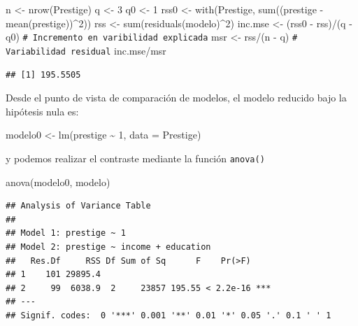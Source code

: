 \documentclass[
]{book}
\newenvironment{Shaded}{\begin{snugshade}}{\end{snugshade}}
\newcommand{\AttributeTok}[1]{\textcolor[rgb]{0.77,0.63,0.00}{#1}}
\newcommand{\CommentTok}[1]{\textcolor[rgb]{0.56,0.35,0.01}{\textit{#1}}}
\newcommand{\DecValTok}[1]{\textcolor[rgb]{0.00,0.00,0.81}{#1}}
\newcommand{\FunctionTok}[1]{\textcolor[rgb]{0.00,0.00,0.00}{#1}}
\newcommand{\NormalTok}[1]{#1}
\newcommand{\OtherTok}[1]{\textcolor[rgb]{0.56,0.35,0.01}{#1}}
\newcommand{\SpecialCharTok}[1]{\textcolor[rgb]{0.00,0.00,0.00}{#1}}
\theoremstyle{break}
\theoremstyle{nonumberplain}
\renewcommand{\CommentTok}[1]{\textcolor[rgb]{0.41,0.41,0.41}{\texttt{#1}}}
\begin{document}
\begin{Shaded}
\begin{Highlighting}[]
\NormalTok{n }\OtherTok{\textless{}{-}} \FunctionTok{nrow}\NormalTok{(Prestige)}
\NormalTok{q }\OtherTok{\textless{}{-}} \DecValTok{3}
\NormalTok{q0 }\OtherTok{\textless{}{-}} \DecValTok{1}
\NormalTok{rss0 }\OtherTok{\textless{}{-}} \FunctionTok{with}\NormalTok{(Prestige, }\FunctionTok{sum}\NormalTok{((prestige }\SpecialCharTok{{-}} \FunctionTok{mean}\NormalTok{(prestige))}\SpecialCharTok{\^{}}\DecValTok{2}\NormalTok{))}
\NormalTok{rss }\OtherTok{\textless{}{-}} \FunctionTok{sum}\NormalTok{(}\FunctionTok{residuals}\NormalTok{(modelo)}\SpecialCharTok{\^{}}\DecValTok{2}\NormalTok{)}
\NormalTok{inc.mse }\OtherTok{\textless{}{-}}\NormalTok{ (rss0 }\SpecialCharTok{{-}}\NormalTok{ rss)}\SpecialCharTok{/}\NormalTok{(q }\SpecialCharTok{{-}}\NormalTok{ q0)  }\CommentTok{\# Incremento en varibilidad explicada}
\NormalTok{msr }\OtherTok{\textless{}{-}}\NormalTok{  rss}\SpecialCharTok{/}\NormalTok{(n }\SpecialCharTok{{-}}\NormalTok{ q)               }\CommentTok{\# Variabilidad residual}
\NormalTok{inc.mse}\SpecialCharTok{/}\NormalTok{msr}
\end{Highlighting}
\end{Shaded}

\begin{verbatim}
## [1] 195.5505
\end{verbatim}

Desde el punto de vista de comparación de modelos, el modelo
reducido bajo la hipótesis nula es:

\begin{Shaded}
\begin{Highlighting}[]
\NormalTok{modelo0 }\OtherTok{\textless{}{-}} \FunctionTok{lm}\NormalTok{(prestige }\SpecialCharTok{\textasciitilde{}} \DecValTok{1}\NormalTok{, }\AttributeTok{data =}\NormalTok{ Prestige)}
\end{Highlighting}
\end{Shaded}

y podemos realizar el contraste mediante la función \texttt{anova()}

\begin{Shaded}
\begin{Highlighting}[]
\FunctionTok{anova}\NormalTok{(modelo0, modelo)}
\end{Highlighting}
\end{Shaded}

\begin{verbatim}
## Analysis of Variance Table
## 
## Model 1: prestige ~ 1
## Model 2: prestige ~ income + education
##   Res.Df     RSS Df Sum of Sq      F    Pr(>F)    
## 1    101 29895.4                                  
## 2     99  6038.9  2     23857 195.55 < 2.2e-16 ***
## ---
## Signif. codes:  0 '***' 0.001 '**' 0.01 '*' 0.05 '.' 0.1 ' ' 1
\end{verbatim}
\end{document}
